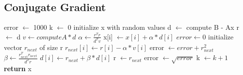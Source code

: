 \documentclass[12pt]{article}
\begin{document}
\subsection{Conjugate Gradient}
\begin{center}
    \begin{algorithmic}[1]
        \Statex {}
        \Statex {}
        \Statex {}
        \Statex {}
        \State error $\gets$ 1000 
        \State k $\gets$ 0 
        \State initialize x with random values
        \State d $\gets$ compute B - Ax
        \State r $\gets$ d
            \State $v \gets compute A*d$
            \State $\alpha \gets \frac{r^Tr}{d^Tv}$
                \State x[i] $\gets x[i] + \alpha*d[i]$
            \EndFor
            \State $error \gets 0$
            \State initialize vector $r_{next}$ of size r
                \State $r_{next}[i] \gets r[i] - \alpha*v[i]$
                \State error $\gets error + r_{next}^2$
            \EndFor
            \State $\beta \gets \frac{r_{next}^Tr_{next}}{d^Tr}$
                \State $d[i] \gets r_{next} + \beta*d[i]$
            \EndFor
            \State r $\gets r_{next}$
            \State error $\gets \sqrt{error}$
            \State k $\gets k + 1 $ 
        \EndWhile
        \State \textbf{return} x
        \EndProcedure
    \end{algorithmic}
\end{center}
\end{document}
